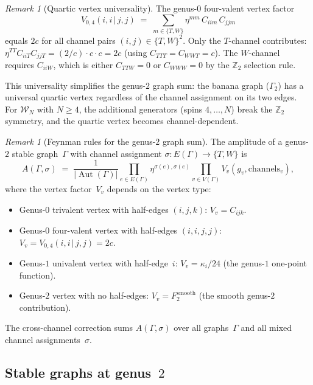 \documentclass[11pt,reqno]{amsart}
\theoremstyle{definition}
\theoremstyle{remark}
\newtheorem{remark}[theorem]{Remark}
\newcommand{\cW}{\mathcal{W}}
\DeclareMathOperator{\Aut}{Aut}
\numberwithin{equation}{section}
\begin{document}
\begin{remark}[Quartic vertex
universality]\label{rem:quartic-univ}
The genus-$0$ four-valent vertex factor
\[
 V_{0,4}(i,i \,|\, j,j)
 \;=\;
 \sum_{m \in \{T,W\}} \eta^{mm}\, C_{iim}\, C_{jjm}
\]
equals $2c$ for all channel pairs
$(i,j) \in \{T,W\}^2$. Only the $T$-channel contributes:
$\eta^{TT} C_{iiT} C_{jjT} = (2/c) \cdot c \cdot c = 2c$
(using $C_{TTT} = C_{WWT} = c$). The $W$-channel requires
$C_{iiW}$, which is either $C_{TTW} = 0$ or $C_{WWW} = 0$
by the $\mathbb{Z}_2$ selection rule.

This universality simplifies the genus-$2$ graph sum: the
banana graph ($\Gamma_2$) has a universal quartic vertex
regardless of the channel assignment on its two edges.
For $\cW_N$ with $N \ge 4$, the additional generators
(spins $4, \ldots, N$) break the $\mathbb{Z}_2$ symmetry,
and the quartic vertex becomes channel-dependent.
\end{remark}

\begin{remark}[Feynman rules for the genus-$2$
graph sum]\label{rem:feynman-rules}
The amplitude of a genus-$2$ stable graph~$\Gamma$ with
channel assignment
$\sigma\colon E(\Gamma) \to \{T, W\}$ is
\begin{equation}\label{eq:feynman-rule}
 A(\Gamma, \sigma)
 \;=\;
 \frac{1}{|\Aut(\Gamma)|}
 \prod_{e \in E(\Gamma)} \eta^{\sigma(e),\sigma(e)}
 \prod_{v \in V(\Gamma)} V_v(g_v, \text{channels}_v),
\end{equation}
where the vertex factor~$V_v$ depends on the vertex type:
\begin{itemize}
\item Genus-$0$ trivalent vertex with half-edges
 $(i,j,k)$: $V_v = C_{ijk}$.
\item Genus-$0$ four-valent vertex with half-edges
 $(i,i,j,j)$: $V_v = V_{0,4}(i,i\,|\,j,j) = 2c$.
\item Genus-$1$ univalent vertex with half-edge~$i$:
 $V_v = \kappa_i/24$ (the genus-$1$ one-point function).
\item Genus-$2$ vertex with no half-edges:
 $V_v = F_2^{\mathrm{smooth}}$ (the smooth genus-$2$
 contribution).
\end{itemize}
The cross-channel correction sums $A(\Gamma, \sigma)$ over
all graphs~$\Gamma$ and all mixed channel
assignments~$\sigma$.
\end{remark}


\subsection{Stable graphs at
genus~$2$}\label{subsec:stable-graphs}
\end{document}
